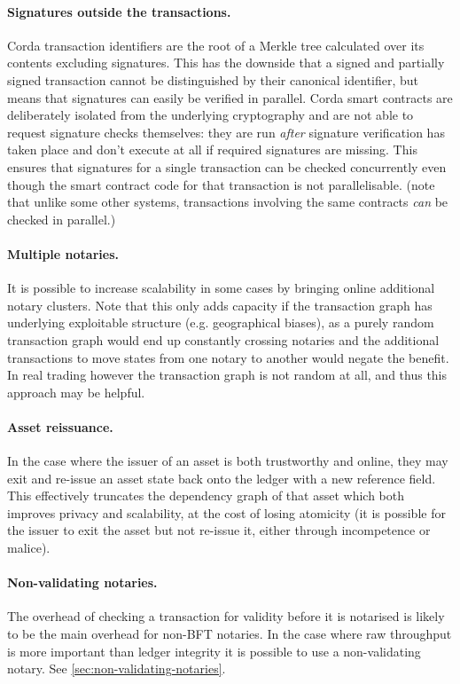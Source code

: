 \documentclass{article}
\begin{document}
\paragraph{Signatures outside the transactions.}Corda transaction identifiers are the root of a Merkle tree
calculated over its contents excluding signatures. This has the downside that a signed and partially signed
transaction cannot be distinguished by their canonical identifier, but means that signatures can easily be
verified in parallel. Corda smart contracts are deliberately isolated from the underlying cryptography and are
not able to request signature checks themselves: they are run \emph{after} signature verification has
taken place and don't execute at all if required signatures are missing. This ensures that signatures for a single
transaction can be checked concurrently even though the smart contract code for that transaction is not parallelisable.
(note that unlike some other systems, transactions involving the same contracts \emph{can} be checked in parallel.)

\paragraph{Multiple notaries.}It is possible to increase scalability in some cases by bringing online additional
notary clusters. Note that this only adds capacity if the transaction graph has underlying exploitable structure
(e.g. geographical biases), as a purely random transaction graph would end up constantly crossing notaries and
the additional transactions to move states from one notary to another would negate the benefit. In real
trading however the transaction graph is not random at all, and thus this approach may be helpful.

\paragraph{Asset reissuance.}In the case where the issuer of an asset is both trustworthy and online, they may
exit and re-issue an asset state back onto the ledger with a new reference field. This effectively truncates the
dependency graph of that asset which both improves privacy and scalability, at the cost of losing atomicity (it
is possible for the issuer to exit the asset but not re-issue it, either through incompetence or malice).

\paragraph{Non-validating notaries.}The overhead of checking a transaction for validity before it is notarised is
likely to be the main overhead for non-BFT notaries. In the case where raw throughput is more important than
ledger integrity it is possible to use a non-validating notary. See \cref{sec:non-validating-notaries}.
\end{document}
